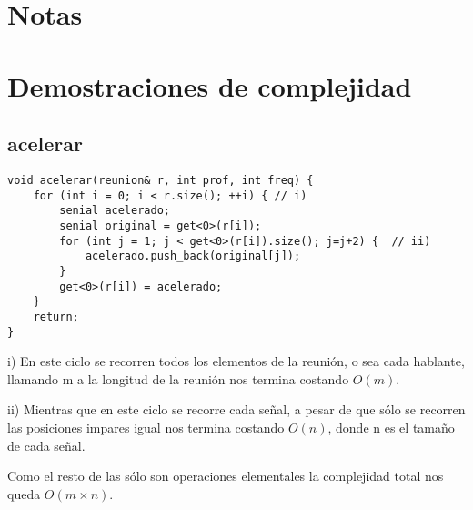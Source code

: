 \documentclass{article}
\begin{document}
\maketitle

\tableofcontents
\newpage



\section*{Notas}
\vspace{0.5cm}


\newpage
{}
\section*{Demostraciones de complejidad}
\vspace{0.5cm}
\subsection{acelerar}
\begin{lstlisting}
void acelerar(reunion& r, int prof, int freq) {
    for (int i = 0; i < r.size(); ++i) { // i)
        senial acelerado;
        senial original = get<0>(r[i]);
        for (int j = 1; j < get<0>(r[i]).size(); j=j+2) {  // ii)
            acelerado.push_back(original[j]);
        }
        get<0>(r[i]) = acelerado;
    }
    return; 
}
\end{lstlisting}
i) En este ciclo se recorren todos los elementos de la reunión, o sea cada hablante, llamando m a la longitud de la reunión nos termina costando $O(m)$.

ii) Mientras que en este ciclo se recorre cada señal, a pesar de que sólo se recorren las posiciones impares igual nos termina costando $O(n)$, donde n es el tamaño de cada señal.

Como el resto de las sólo son operaciones elementales la complejidad total nos queda $O(m \times n)$.


\newpage
\end{document}
